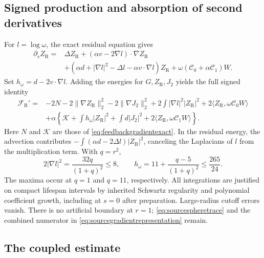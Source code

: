 \documentclass[11pt]{article}
\numberwithin{equation}{section}
\begin{document}
\subsection{Signed production and absorption of second derivatives}

For $l=\log\omega$, the exact residual equation gives
\begin{align}
 \partial_sZ_{\mathrm R}={}&\Delta Z_{\mathrm R}
   +(\alpha v-2\nabla l)\cdot\nabla Z_{\mathrm R}\nonumber\\
 &+(\alpha d+|\nabla l|^2-\Delta l-\alpha v\cdot\nabla l)Z_{\mathrm R}
   +\omega(\mathscr C_0+\alpha\mathscr C_1)W.
 \label{eq:weightedconjugation}
\end{align}
Set $h_\omega=d-2v\cdot\nabla l$. Adding the energies for
$G,Z_{\mathrm R},J_2$ yields the full signed identity
\begin{align}
 \mathcal F_{\mathrm R}'={}&-2N-2\|\nabla Z_{\mathrm R}\|_2^2
   -2\|\nabla J_2\|_2^2
   +2\int|\nabla l|^2|Z_{\mathrm R}|^2
   +2\langle Z_{\mathrm R},\omega\mathscr C_0W\rangle\nonumber\\
 &+\alpha\left\{\mathcal K+\int h_\omega|Z_{\mathrm R}|^2
   +\int d|J_2|^2
   +2\langle Z_{\mathrm R},\omega\mathscr C_1W\rangle\right\}.
 \label{eq:weightedsignedproduction}
\end{align}
Here $N$ and $\mathcal K$ are those of
\eqref{eq:feedbackgradientexact}. In the residual energy, the advection
contributes $-\int(\alpha d-2\Delta l)|Z_{\mathrm R}|^2$, canceling
the Laplacians of $l$ from the multiplication term. With $q=r^2$,
\begin{equation}\label{eq:weightedweightconstants}
 2|\nabla l|^2=\frac{32q}{(1+q)^2}\le8,\qquad
 h_\omega=11+\frac{q-5}{(1+q)^2}\le\frac{265}{24}.
\end{equation}
The maxima occur at $q=1$ and $q=11$, respectively. All integrations
are justified on compact lifespan intervals by inherited Schwartz
regularity and polynomial coefficient growth, including at $s=0$
after preparation. Large-radius cutoff errors vanish. There is no
artificial boundary at $r=1$; \eqref{eq:sourcespheretrace} and the
combined numerator in \eqref{eq:sourcegradientrepresentation} remain.

\subsection{The coupled estimate}
\end{document}
